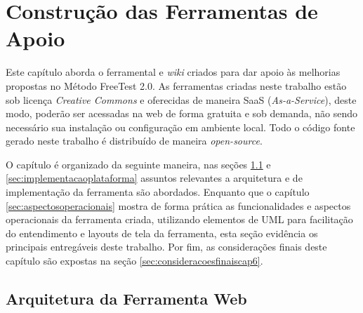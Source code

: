 \chapter{Construção das Ferramentas de Apoio}
\label{sec:ferramentas}

Este capítulo aborda o ferramental e \textit{wiki} criados para dar apoio às melhorias propostas no Método FreeTest 2.0. As ferramentas criadas neste trabalho estão sob licença \textit{Creative Commons} e oferecidas de maneira SaaS (\textit{As-a-Service}), deste modo, poderão ser acessadas na web de forma gratuita e sob demanda, não sendo necessário sua instalação ou configuração em ambiente local. Todo o código fonte gerado neste trabalho é distribuído de maneira \textit{open-source}. 

O capítulo é organizado da seguinte maneira, nas seções \ref{sec:arquiteturaplataforma} e \ref{sec:implementacaoplataforma} assuntos relevantes a arquitetura e de implementação da ferramenta são abordados. Enquanto que o capítulo \ref{sec:aspectosoperacionais} mostra de forma prática as funcionalidades e aspectos operacionais da ferramenta criada, utilizando elementos de UML para facilitação do entendimento e layouts de tela da ferramenta, esta seção evidência os principais entregáveis deste trabalho. Por fim, as considerações finais deste capítulo são expostas na seção \ref{sec:consideracoesfinaiscap6}.

\section{Arquitetura da Ferramenta Web}
\label{sec:arquiteturaplataforma}

